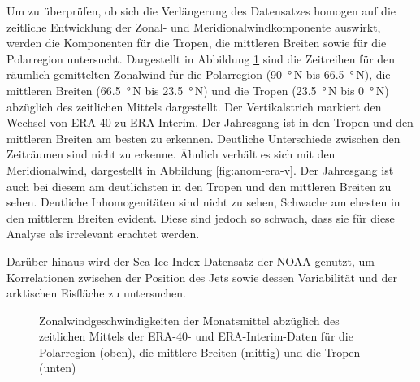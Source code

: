 Um zu überprüfen, ob sich die Verlängerung des Datensatzes homogen auf die zeitliche Entwicklung der Zonal- und Meridionalwindkomponente auswirkt, werden die Komponenten für die Tropen, die mittleren Breiten sowie für die Polarregion untersucht. Dargestellt in Abbildung \ref{fig:anom-era-u} sind die Zeitreihen für den räumlich gemittelten Zonalwind für die Polarregion (\SI{90}{\degree}\,N bis \SI{66.5}{\degree}\,N), die mittleren Breiten (\SI{66.5}{\degree}\,N bis \SI{23.5}{\degree}\,N) und die Tropen (\SI{23.5}{\degree}\,N bis \SI{0}{\degree}\,N) abzüglich des zeitlichen Mittels dargestellt. Der Vertikalstrich markiert den Wechsel von ERA-40 zu ERA-Interim. Der Jahresgang ist in den Tropen und den mittleren Breiten am besten zu erkennen. Deutliche Unterschiede zwischen den Zeiträumen sind nicht zu erkenne. Ähnlich verhält es sich mit den Meridionalwind, dargestellt in Abbildung \ref{fig:anom-era-v}. Der Jahresgang ist auch bei diesem am deutlichsten in den Tropen und den mittleren Breiten zu sehen. Deutliche Inhomogenitäten sind nicht zu sehen, Schwache am ehesten in den mittleren Breiten evident. Diese sind jedoch so schwach, dass sie für diese Analyse als irrelevant erachtet werden.

Darüber hinaus wird der Sea-Ice-Index-Datensatz der NOAA \citep{sii-2016} genutzt, um Korrelationen zwischen der Position des Jets sowie dessen Variabilität und der arktischen Eisfläche zu untersuchen.

\begin{figure}[H]
  \begin{minipage}{\textwidth}
    \centering
  \end{minipage}
  \begin{minipage}{\textwidth}
    \centering
  \end{minipage}
  \begin{minipage}{\textwidth}
    \centering
  \end{minipage}
  \caption[Homogenitätsanalyse des Zonalwinds für ERA-40 und ERA-Interim]{Zonalwindgeschwindigkeiten der Monatsmittel abzüglich des zeitlichen Mittels der ERA-40- und ERA-Interim-Daten für die Polarregion (oben), die mittlere Breiten (mittig) und die Tropen (unten)} \label{fig:anom-era-u}
\end{figure}

